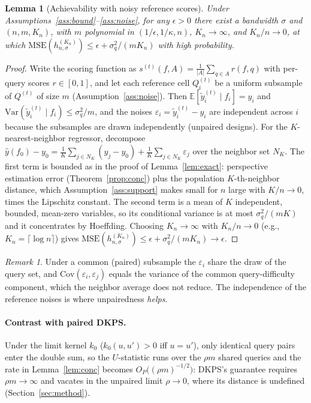 \documentclass{article}
\newtheorem{lemma}{Lemma}
\theoremstyle{definition}
\theoremstyle{remark}
\newtheorem{remark}{Remark}
\theoremstyle{plain}
\begin{document}
\begin{lemma}[Achievability with noisy reference scores]
\label{lem:noisy}
Under Assumptions~\ref{ass:bound}--\ref{ass:noise}, for any $\epsilon>0$ there exist
a bandwidth $\sigma$ and $(n,m,K_{n})$, with $m$ polynomial in
$(1/\epsilon,1/\kappa,n)$, $K_{n}\to\infty$, and $K_{n}/n\to0$, at which
$\mathrm{MSE}(h_{n,\sigma}^{(K_{n})})\le\epsilon+\sigma_q^2/(mK_{n})$ with high
probability.
\end{lemma}
\begin{proof}
Write the scoring function as
$s^{(t)}(f,A)=\tfrac{1}{|A|}\sum_{q\in A}r(f,q)$ with per-query scores
$r\in[0,1]$, and let each reference cell $Q_{i}^{(t)}$ be a uniform subsample of
$Q^{(t)}$ of size $m$ (Assumption~\ref{ass:noise}). Then
$\mathbb{E}[\tilde{y}_{i}^{(t)}\mid f_{i}]=y_{i}$ and
$\mathrm{Var}(\tilde{y}_{i}^{(t)}\mid f_{i})\le\sigma_q^2/m$, and the noises
$\varepsilon_{i}=\tilde{y}_{i}^{(t)}-y_{i}$ are independent across $i$ because
the subsamples are drawn independently (unpaired designs). For the $K$-nearest-neighbor regressor, decompose
$\hat y(f_{0})-y_{0}=\tfrac1K\sum_{j\in N_K}(y_{j}-y_{0})+\tfrac1K\sum_{j\in
N_K}\varepsilon_{j}$ over the neighbor set $N_K$. The first term is bounded as in
the proof of Lemma~\ref{lem:exact}: perspective estimation error
(Theorem~\ref{prop:conc}) plus the population $K$-th-neighbor distance, which
Assumption~\ref{ass:support} makes small for $n$ large with $K/n\to0$, times the
Lipschitz constant. The second term is a mean of $K$ independent, bounded,
mean-zero variables, so its conditional variance is at most $\sigma_q^2/(mK)$ and
it concentrates by Hoeffding. Choosing $K_{n}\to\infty$ with $K_{n}/n\to0$ (e.g.,
$K_{n}=\lceil\log n\rceil$) gives
$\mathrm{MSE}(h_{n,\sigma}^{(K_{n})})\le\epsilon+\sigma_q^2/(mK_{n})\to\epsilon$.
\end{proof}
\begin{remark}
Under a common (paired) subsample the $\varepsilon_{i}$ share the draw of the query
set, and $\mathrm{Cov}(\varepsilon_{i},\varepsilon_{j})$ equals the variance of the
common query-difficulty component, which the neighbor average does not reduce. The
independence of the reference noises is where unpairedness \emph{helps}.
\end{remark}

\paragraph{Contrast with paired DKPS.} Under the limit kernel $k_{0}$
($k_{0}(u,u')>0$ iff $u=u'$), only identical query pairs enter the double sum, so the
$U$-statistic runs over the $\rho m$ shared queries
and the rate in Lemma~\ref{lem:conc} becomes $O_P\big((\rho m)^{-1/2}\big)$: DKPS's
guarantee requires $\rho m\to\infty$ and vacates in the unpaired limit $\rho\to0$,
where its distance is undefined (Section~\ref{sec:method}).
\end{document}
